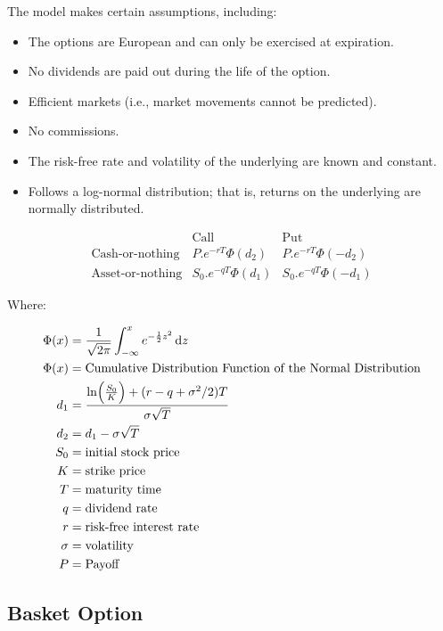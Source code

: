 \documentclass[]{elsarticle}
\theoremstyle{definition}
\theoremstyle{remark}
\begin{document}
The model makes certain assumptions, including:
\begin{itemize}
\item The options are European and can only be exercised at expiration.
\item No dividends are paid out during the life of the option.
\item Efficient markets (i.e., market movements cannot be predicted).
\item No commissions.
\item The risk-free rate and volatility of the underlying are known and constant.
\item Follows a log-normal distribution; that is, returns on the underlying are normally distributed.
\end{itemize}

$$\begin{array}{rcc}
& \text{Call}  & \text{Put} \\
\text{Cash-or-nothing} & P.e^{-rT}\Phi(d_2) & P.e^{-rT}\Phi(-d_2) \\
\text{Asset-or-nothing} & S_0.e^{-qT}\Phi(d_1) & S_0.e^{-qT}\Phi(-d_1)
\end{array}$$

Where:

\begin{align*}
\Phi(x) & =\frac{1}{\sqrt{2\pi}}\int_{-\infty}^{x}e^{-\frac{1}{2}z^2} \, 
{\rm
d}z \\
\Phi(x) & = \text{Cumulative Distribution Function of the Normal 
Distribution} \\ 
d_1 &=\frac{\ln \Bigl(\frac{S_0}{K} \Bigr)+(r-q+\sigma^2/2)T}
{\sigma\sqrt{T}} \\
d_2 &=d_1-\sigma\sqrt{T} \\
S_0 & = \text{initial stock price} \\
K & = \text{strike price}\\
T & = \text{maturity time}\\
q & = \text{dividend rate}\\
r & = \text{risk-free interest rate}\\
\sigma & = \text{volatility}\\
P & = \text{Payoff}\\
\end{align*}

\subsection{Basket Option}
\end{document}
